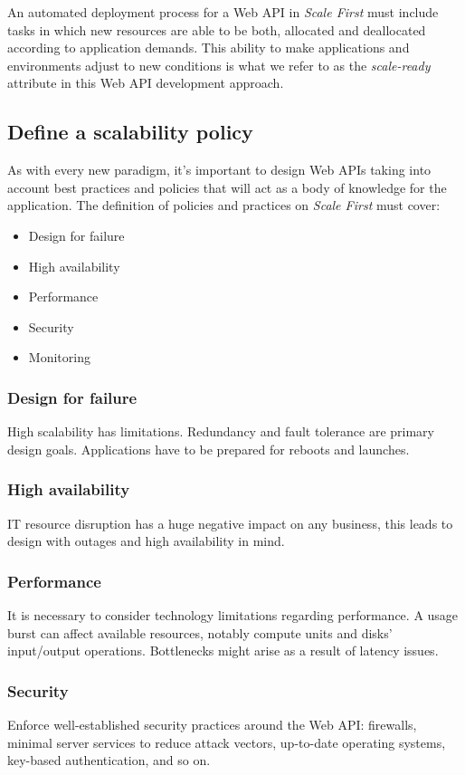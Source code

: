 \documentclass[10pt,article]{IEEEtran}
\begin{document}
An automated deployment process for a Web API in \textit{Scale First} must include tasks in which new resources are able to be both, allocated and deallocated according to application demands. This ability to make applications and environments adjust to new conditions is what we refer to as the \textit{scale-ready} attribute in this Web API development approach. 
 

\subsection{Define a scalability policy}
As with every new paradigm, it's important to design Web APIs taking into account best practices and policies that will act as a body of knowledge for the application.
The definition of policies and practices on \textit{Scale First} must cover:
\begin{itemize}
    \item
    Design for failure
    \item
    High availability
    \item
    Performance
    \item
    Security
    \item
    Monitoring
\end{itemize}

\subsubsection{Design for failure}
High scalability has limitations. Redundancy and fault tolerance are primary design goals. Applications have  to be prepared for reboots and launches.

\subsubsection{High availability}
IT resource disruption has a huge negative impact on any business, this leads to design with outages and high availability in mind.

\subsubsection{Performance}
It is necessary to consider technology limitations regarding performance. A usage burst can affect available resources, notably compute units and disks' input/output operations. Bottlenecks might arise as a result of latency issues. 

\subsubsection{Security}
Enforce well-established security practices around the Web API: firewalls, minimal server services to reduce attack vectors, up-to-date operating systems, key-based authentication, and so on.
\end{document}
